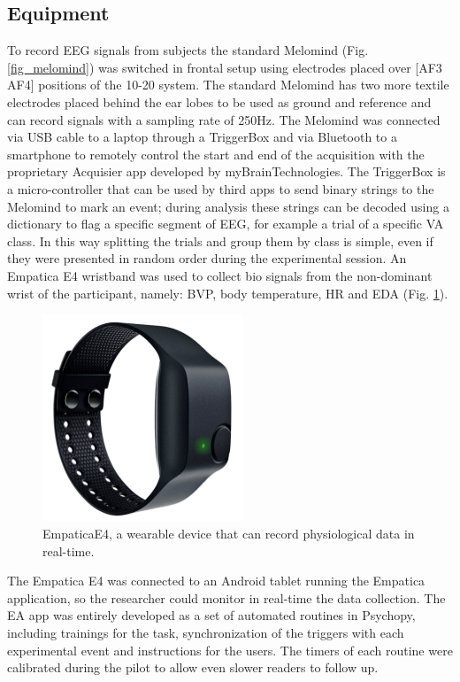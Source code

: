 \subsection{Equipment}
\label{sec:equipment}
To record \ac{EEG} signals from subjects the standard Melomind (Fig. \ref{fig_melomind}) was switched in frontal setup using electrodes placed over [AF3 AF4] positions of the 10-20 system. The standard Melomind has two more textile electrodes placed behind the ear lobes to be used as ground and reference and can record signals with a sampling rate of 250Hz. The Melomind was connected via USB cable to a laptop through a TriggerBox and via Bluetooth to a smartphone to remotely control the start and end of the acquisition with  the proprietary Acquisier app developed by myBrainTechnologies. The TriggerBox is a micro-controller that can be used by third apps to send binary strings to the Melomind to mark an event; during analysis these strings can be decoded using a dictionary to flag a specific segment of \ac{EEG}, for example a trial of a specific \ac{VA} class. In this way splitting the trials and group them by class is simple, even if they were presented in random order during the experimental session. An Empatica E4  wristband was used to collect bio signals from the non-dominant wrist of the participant, namely: \ac{BVP}, body temperature, \ac{HR} and \ac{EDA} (Fig. \ref{fig_empatica}). 

\begin{figure}[h!]
\includegraphics[width=6cm]{img/methods/empaticaE4.png}
\centering
\caption{EmpaticaE4, a wearable device that can record physiological data in real-time.} \label{fig_empatica}
\end{figure}

The Empatica E4 was connected to an Android tablet running the Empatica application, so the researcher could monitor in real-time the data collection. The \ac{EA} app was entirely developed as a set of automated routines in Psychopy, including trainings for the task, synchronization of the triggers with each experimental event and instructions for the users. The timers of each routine were calibrated during the pilot to allow even slower readers to follow up. 

